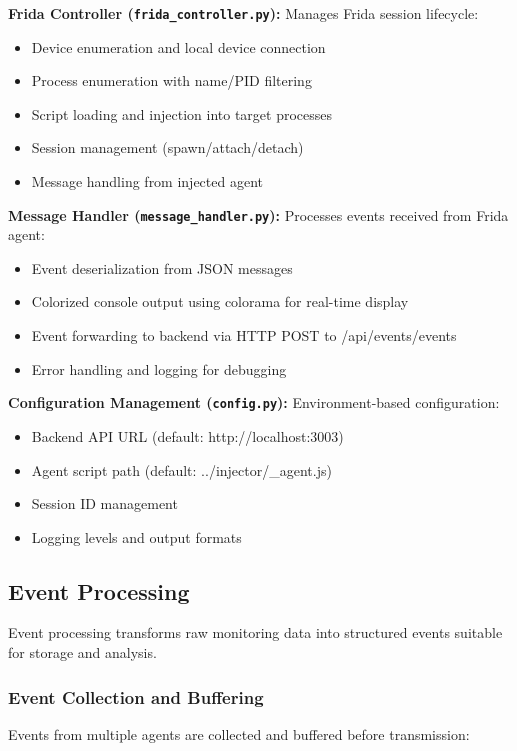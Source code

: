 \textbf{Frida Controller (\texttt{frida\_controller.py}):}
Manages Frida session lifecycle:
\begin{itemize}
    \item Device enumeration and local device connection
    \item Process enumeration with name/PID filtering
    \item Script loading and injection into target processes
    \item Session management (spawn/attach/detach)
    \item Message handling from injected agent
\end{itemize}

\textbf{Message Handler (\texttt{message\_handler.py}):}
Processes events received from Frida agent:
\begin{itemize}
    \item Event deserialization from JSON messages
    \item Colorized console output using colorama for real-time display
    \item Event forwarding to backend via HTTP POST to /api/events/events
    \item Error handling and logging for debugging
\end{itemize}

\textbf{Configuration Management (\texttt{config.py}):}
Environment-based configuration:
\begin{itemize}
    \item Backend API URL (default: http://localhost:3003)
    \item Agent script path (default: ../injector/\_agent.js)
    \item Session ID management
    \item Logging levels and output formats
\end{itemize}

\subsection{Event Processing}

Event processing transforms raw monitoring data into structured events suitable for storage and analysis.

\subsubsection{Event Collection and Buffering}

Events from multiple agents are collected and buffered before transmission:

